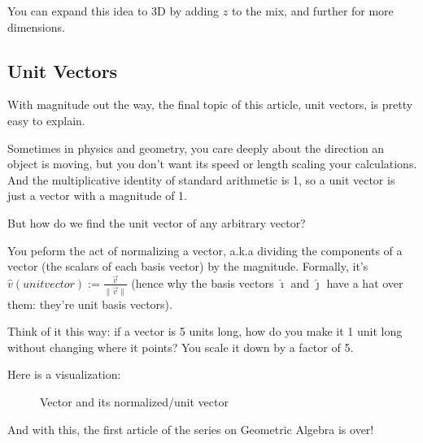 \documentclass[12pt]{article}
\begin{document}
You can expand this idea to 3D by adding $z$ to the mix, and further for more dimensions.

\subsection{Unit Vectors}

With magnitude out the way, the final topic of this article, unit vectors, is pretty easy to explain.

Sometimes in physics and geometry, you care deeply about the direction an object is moving, but you don't want its speed or length scaling your calculations. And the multiplicative identity of standard arithmetic is 1, so a unit vector is just a vector with a magnitude of 1.

But how do we find the unit vector of any arbitrary vector?

You peform the act of normalizing a vector, a.k.a dividing the components of a vector (the scalars of each basis vector) by the magnitude. Formally, it's $\hat{v} (unit vector) := \frac{\vec{v}}{\|\vec{v}\|}$ (hence why the basis vectors $\hat{\imath}$ and $\hat{\jmath}$ have a hat over them: they're unit basis vectors).

Think of it this way: if a vector is 5 units long, how do you make it 1 unit long without changing where it points? You scale it down by a factor of 5.

Here is a visualization:

\begin{figure}[H]
    \centering
    \caption{Vector and its normalized/unit vector}
\end{figure}

And with this, the first article of the series on Geometric Algebra is over!

\printbibliography{}
\end{document}

